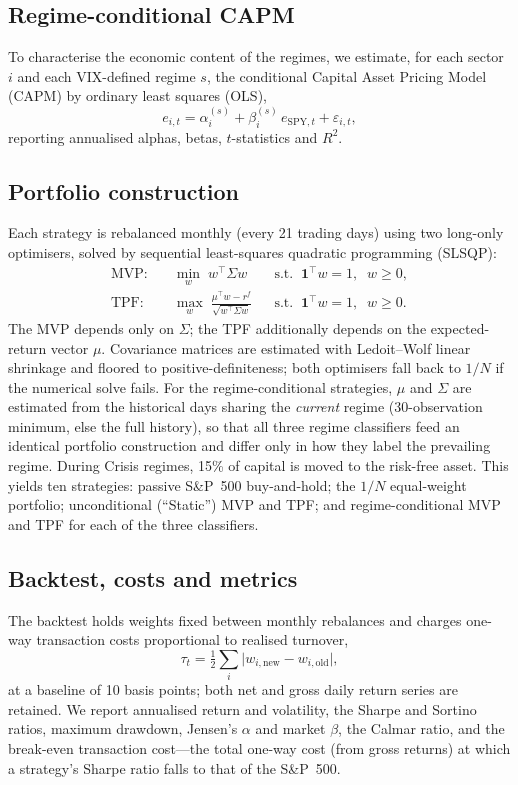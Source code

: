 \documentclass[12pt,a4paper]{article}
\newcommand{\rf}{r^{f}}
\begin{document}
\subsection{Regime-conditional CAPM}
To characterise the economic content of the regimes, we estimate, for each sector $i$ and
each VIX-defined regime $s$, the conditional Capital Asset Pricing Model (CAPM) by
ordinary least squares (OLS),
\begin{equation}
  e_{i,t}=\alpha_i^{(s)}+\beta_i^{(s)}\,e_{\mathrm{SPY},t}+\varepsilon_{i,t},
\end{equation}
reporting annualised alphas, betas, $t$-statistics and $R^2$.

\subsection{Portfolio construction}
Each strategy is rebalanced monthly (every 21 trading days) using two long-only
optimisers, solved by sequential least-squares quadratic programming (SLSQP):
\begin{align}
  \text{MVP:}\quad & \min_{w}\; w^{\top}\Sigma w
    && \text{s.t.}\;\; \mathbf{1}^{\top}w=1,\;\; w\ge 0, \\[2pt]
  \text{TPF:}\quad & \max_{w}\; \frac{\mu^{\top}w-\rf}{\sqrt{w^{\top}\Sigma w}}
    && \text{s.t.}\;\; \mathbf{1}^{\top}w=1,\;\; w\ge 0 .
\end{align}
The MVP depends only on $\Sigma$; the TPF additionally depends on the expected-return
vector $\mu$. Covariance matrices are estimated with Ledoit--Wolf linear shrinkage and
floored to positive-definiteness; both optimisers fall back to $1/N$ if the numerical
solve fails. For the regime-conditional strategies, $\mu$ and $\Sigma$ are estimated from
the historical days sharing the \emph{current} regime (30-observation minimum, else the
full history), so that all three regime classifiers feed an identical portfolio
construction and differ only in how they label the prevailing regime. During Crisis
regimes, 15\% of capital
is moved to the risk-free asset. This yields ten strategies: passive S\&P~500
buy-and-hold; the $1/N$ equal-weight portfolio; unconditional (``Static'') MVP and TPF;
and regime-conditional MVP and TPF for each of the three classifiers.

\subsection{Backtest, costs and metrics}
The backtest holds weights fixed between monthly rebalances and charges one-way
transaction costs proportional to realised turnover,
\begin{equation}
  \tau_t=\tfrac{1}{2}\sum_i\bigl|w_{i,\text{new}}-w_{i,\text{old}}\bigr|,
\end{equation}
at a baseline of 10 basis points; both net and gross daily return series are retained. We
report annualised return and volatility, the Sharpe and Sortino ratios, maximum drawdown,
Jensen's $\alpha$ and market $\beta$, the Calmar ratio, and the break-even transaction
cost---the total one-way cost (from gross returns) at which a strategy's Sharpe ratio
falls to that of the S\&P~500.
\end{document}
